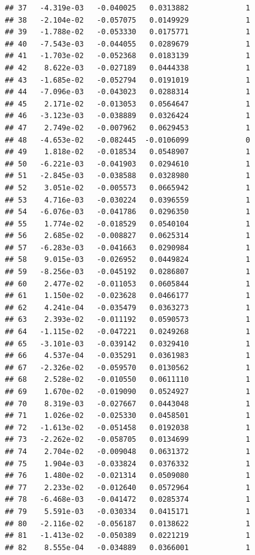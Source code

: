 \documentclass[12pt]{article}\usepackage[]{graphicx}\usepackage[]{xcolor}
\makeatletter
\newenvironment{kframe}{%
 \def\at@end@of@kframe{}%
 \ifinner\ifhmode%
  \def\at@end@of@kframe{\end{minipage}}%
  \begin{minipage}{\columnwidth}%
 \fi\fi%
 \def\FrameCommand##1{\hskip\@totalleftmargin \hskip-\fboxsep
 \colorbox{shadecolor}{##1}\hskip-\fboxsep
     \hskip-\linewidth \hskip-\@totalleftmargin \hskip\columnwidth}%
 \MakeFramed {\advance\hsize-\width
   \@totalleftmargin\z@ \linewidth\hsize
   \@setminipage}}%
 {\par\unskip\endMakeFramed%
 \at@end@of@kframe}
\newenvironment{knitrout}{}{} %
\makeatother
\begin{document}
\begin{knitrout}
\begin{kframe}
\begin{verbatim}
## 37   -4.319e-03   -0.040025   0.0313882             1
## 38   -2.104e-02   -0.057075   0.0149929             1
## 39   -1.788e-02   -0.053330   0.0175771             1
## 40   -7.543e-03   -0.044055   0.0289679             1
## 41   -1.703e-02   -0.052368   0.0183139             1
## 42    8.622e-03   -0.027189   0.0444338             1
## 43   -1.685e-02   -0.052794   0.0191019             1
## 44   -7.096e-03   -0.043023   0.0288314             1
## 45    2.171e-02   -0.013053   0.0564647             1
## 46   -3.123e-03   -0.038889   0.0326424             1
## 47    2.749e-02   -0.007962   0.0629453             1
## 48   -4.653e-02   -0.082445  -0.0106099             0
## 49    1.818e-02   -0.018534   0.0548907             1
## 50   -6.221e-03   -0.041903   0.0294610             1
## 51   -2.845e-03   -0.038588   0.0328980             1
## 52    3.051e-02   -0.005573   0.0665942             1
## 53    4.716e-03   -0.030224   0.0396559             1
## 54   -6.076e-03   -0.041786   0.0296350             1
## 55    1.774e-02   -0.018529   0.0540104             1
## 56    2.685e-02   -0.008827   0.0625314             1
## 57   -6.283e-03   -0.041663   0.0290984             1
## 58    9.015e-03   -0.026952   0.0449824             1
## 59   -8.256e-03   -0.045192   0.0286807             1
## 60    2.477e-02   -0.011053   0.0605844             1
## 61    1.150e-02   -0.023628   0.0466177             1
## 62    4.241e-04   -0.035479   0.0363273             1
## 63    2.393e-02   -0.011192   0.0590573             1
## 64   -1.115e-02   -0.047221   0.0249268             1
## 65   -3.101e-03   -0.039142   0.0329410             1
## 66    4.537e-04   -0.035291   0.0361983             1
## 67   -2.326e-02   -0.059570   0.0130562             1
## 68    2.528e-02   -0.010550   0.0611110             1
## 69    1.670e-02   -0.019090   0.0524927             1
## 70    8.319e-03   -0.027667   0.0443048             1
## 71    1.026e-02   -0.025330   0.0458501             1
## 72   -1.613e-02   -0.051458   0.0192038             1
## 73   -2.262e-02   -0.058705   0.0134699             1
## 74    2.704e-02   -0.009048   0.0631372             1
## 75    1.904e-03   -0.033824   0.0376332             1
## 76    1.480e-02   -0.021314   0.0509080             1
## 77    2.233e-02   -0.012640   0.0572964             1
## 78   -6.468e-03   -0.041472   0.0285374             1
## 79    5.591e-03   -0.030334   0.0415171             1
## 80   -2.116e-02   -0.056187   0.0138622             1
## 81   -1.413e-02   -0.050389   0.0221219             1
## 82    8.555e-04   -0.034889   0.0366001             1

\end{verbatim}
\end{kframe}
\end{knitrout}
\end{document}
